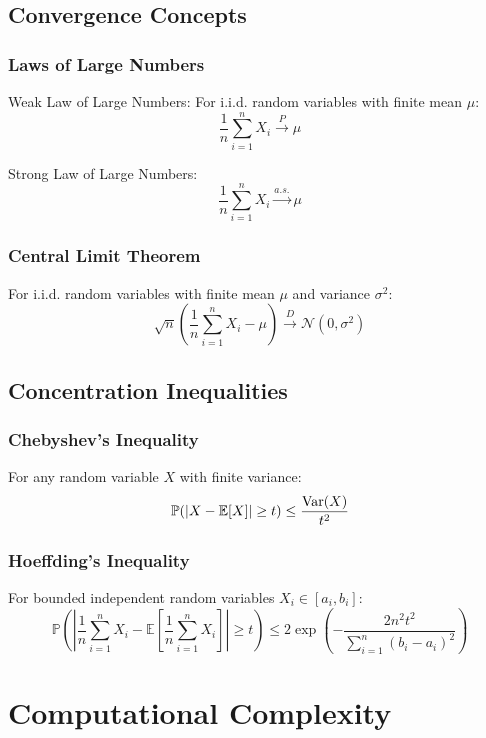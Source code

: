 \documentclass{article}
\begin{document}
\subsection{Convergence Concepts}

\subsubsection{Laws of Large Numbers}

Weak Law of Large Numbers: For i.i.d. random variables with finite mean $\mu$:
\[
\frac{1}{n} \sum_{i=1}^n X_i \xrightarrow{P} \mu
\]

Strong Law of Large Numbers:
\[
\frac{1}{n} \sum_{i=1}^n X_i \xrightarrow{a.s.} \mu
\]

\subsubsection{Central Limit Theorem}

For i.i.d. random variables with finite mean $\mu$ and variance $\sigma^2$:
\[
\sqrt{n} \left( \frac{1}{n} \sum_{i=1}^n X_i - \mu \right) \xrightarrow{D} \mathcal{N}(0, \sigma^2)
\]

\subsection{Concentration Inequalities}

\subsubsection{Chebyshev's Inequality}

For any random variable $X$ with finite variance:
\[
\mathbb{P}(|X - \mathbb{E}[X]| \geq t) \leq \frac{\mathrm{Var}(X)}{t^2}
\]

\subsubsection{Hoeffding's Inequality}

For bounded independent random variables $X_i \in [a_i, b_i]$:
\[
\mathbb{P}\left( \left| \frac{1}{n} \sum_{i=1}^n X_i - \mathbb{E}\left[\frac{1}{n} \sum_{i=1}^n X_i\right] \right| \geq t \right) \leq 2\exp\left( -\frac{2n^2 t^2}{\sum_{i=1}^n (b_i - a_i)^2} \right)
\]

\section{Computational Complexity}
\end{document}
